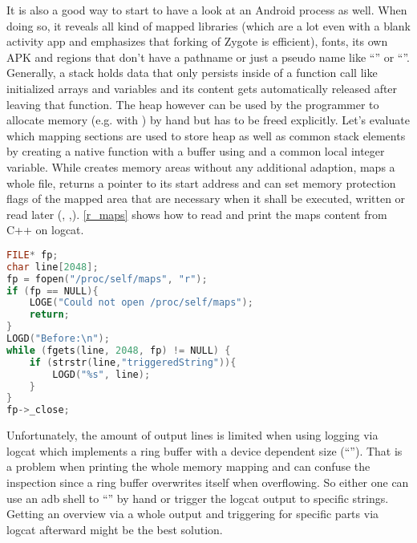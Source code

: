 It is also a good way to start to have a look at an Android process as well.
When doing so, it reveals all kind of mapped libraries (which are a lot even 
with a blank activity app and emphasizes that forking of Zygote is efficient), fonts, its own APK and regions that don't have a pathname or just a pseudo name like
``'' or ``\code{[stack]}''. Generally, a stack holds
data that only persists inside of a function call like initialized arrays and
variables and its content gets automatically released after leaving that function.
The heap however can be used by the programmer to allocate memory
(e.g. with ) by hand but has to be freed explicitly.
Let's evaluate which mapping sections are used to store heap as well as common stack
elements by creating a native function with a buffer using 
and a common local integer variable. While  creates memory areas
without any additional adaption,  maps a whole file, returns a pointer
to its start address and can set memory protection flags of the mapped area that
are necessary when it shall be executed, written or read later (,
 ,).
\autoref{r_maps} shows how to read and print the maps content from C++ on logcat.
\begin{lstlisting}[language=C++, caption=Reading /proc/self/maps, label=r_maps]
FILE* fp;
char line[2048];
fp = fopen("/proc/self/maps", "r");
if (fp == NULL){
    LOGE("Could not open /proc/self/maps");
    return;
}
LOGD("Before:\n");
while (fgets(line, 2048, fp) != NULL) {
    if (strstr(line,"triggeredString")){
        LOGD("%s", line);
    }
}
fp->_close;
\end{lstlisting}
Unfortunately, the amount of output lines is limited when using logging via logcat which
implements a ring buffer with a device dependent size (``''). That
is a problem when printing the whole memory mapping and can confuse the inspection 
since a ring buffer overwrites itself when overflowing. So either one can use an
adb shell to ``'' by hand or trigger the logcat output to
specific strings. Getting an overview via a whole output and triggering for specific
parts via logcat afterward might be the best solution. 

